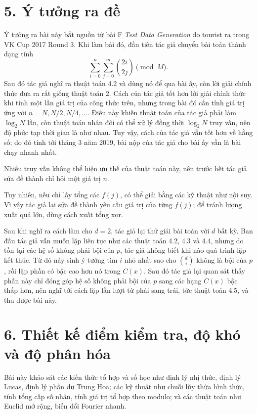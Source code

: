 \documentclass[11pt]{article}
\begin{document}
\section*{5. Ý tưởng ra đề}

Ý tưởng ra bài này bắt nguồn từ bài F \emph{Test Data Generation} do tourist
ra trong VK Cup 2017 Round 3. Khi làm bài đó, đầu tiên tác giả chuyển bài toán
thành dạng tính
\[
  \sum_{i=0}^{n}\sum_{j=0}^{m}\binom{2i}{2j}\pmod M.
\]
Sau đó tác giả nghĩ ra thuật toán 4.2 và dùng nó để qua bài ấy, còn lời giải
chính thức đưa ra rất giống thuật toán 2. Cách của tác giả tốt hơn lời giải
chính thức khi tính một lần giá trị của công thức trên, nhưng trong bài đó cần
tính giá trị ứng với \(n=N,N/2,N/4,\ldots\). Điều này khiến thuật toán của tác
giả phải làm \(\log_2 N\) lần, còn thuật toán nhân đôi có thể xử lý đồng thời
\(\log_2 N\) truy vấn, nên độ phức tạp thời gian là như nhau. Tuy vậy, cách
của tác giả vẫn tốt hơn về hằng số; do đó tính tới tháng 3 năm 2019, bài nộp
của tác giả cho bài ấy vẫn là bài chạy nhanh nhất.

Nhiều truy vấn không thể hiện ưu thế của thuật toán này, nên trước hết tác
giả sửa đề thành chỉ hỏi một giá trị \(n\).

Tuy nhiên, nếu chỉ lấy tổng các \(f(j)\), có thể giải bằng các kỹ thuật như
nội suy. Vì vậy tác giả lại sửa đề thành yêu cầu giá trị của từng \(f(j)\);
để tránh lượng xuất quá lớn, dùng cách xuất tổng xor.

Sau khi nghĩ ra cách làm cho \(d=2\), tác giả lại thử giải bài toán với \(d\)
bất kỳ. Ban đầu tác giả vẫn muốn lặp liên tục như các thuật toán 4.2, 4.3 và
4.4, nhưng do tồn tại các hệ số không phải bội của \(p\), tác giả không biết
khi nào quá trình lặp kết thúc. Từ đó nảy sinh ý tưởng tìm \(i\) nhỏ nhất sao
cho \(\binom{d}{i}\) không là bội của \(p\), rồi lặp phần có bậc cao hơn nó
trong \(C(x)\). Sau đó tác giả lại quan sát thấy phần này chỉ đóng góp hệ số
không phải bội của \(p\) sang các hạng \(C(x)\) bậc thấp hơn, nên nghĩ tới
cách lặp lần lượt từ phải sang trái, tức thuật toán 4.5, và thu được bài này.

\section*{6. Thiết kế điểm kiểm tra, độ khó và độ phân hóa}

Bài này khảo sát các kiến thức tổ hợp và số học như định lý nhị thức, định lý
Lucas, định lý phần dư Trung Hoa; các kỹ thuật như chuỗi lũy thừa hình thức,
tính tổng cấp số nhân, tính giá trị tổ hợp theo modulo; và các thuật toán như
Euclid mở rộng, biến đổi Fourier nhanh.
\end{document}
